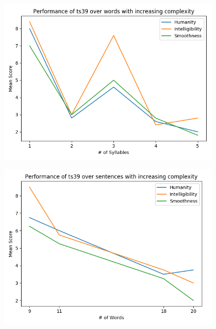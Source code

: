 \documentclass[10pt, journal, compsoc]{IEEEtran}
\begin{document}
\begin{figure}[h]
    \caption{}
    \centering
    \includegraphics[width=1\linewidth]{../experiments/results/ts39_word_results.png}
\end{figure}
\begin{figure}[h]
    \caption{}
    \centering
    \includegraphics[width=1\linewidth]{../experiments/results/ts39_sent_results.png}
\end{figure}
\end{document}
